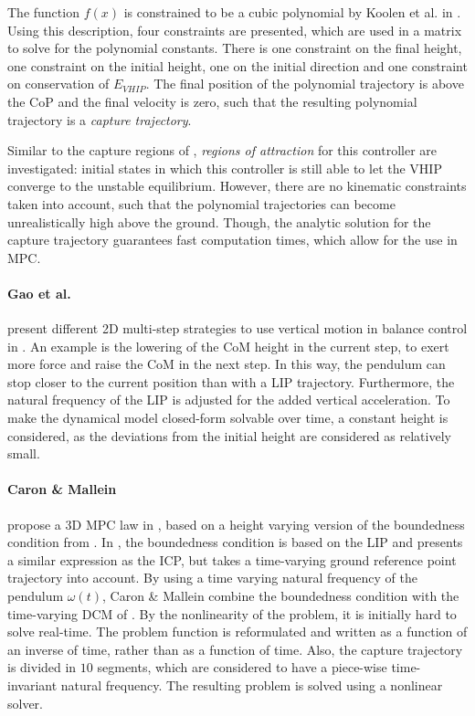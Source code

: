 The function $f(x)$ is constrained to be a cubic polynomial by Koolen et al. in \cite{koolen2016balance}. Using this description, four constraints are presented, which are used in a matrix to solve for the polynomial constants. There is one constraint on the final height, one constraint on the initial height, one on the initial direction and one constraint on conservation of $E_{VHIP}$. The final position of the polynomial trajectory is above the \ac{CoP} and the final velocity is zero, such that the resulting polynomial trajectory is a \textit{capture trajectory}. 

Similar to the capture regions of \cite{pratt2006capture}, \textit{regions of attraction} for this controller are investigated: initial states in which this controller is still able to let the \ac{VHIP} converge to the unstable equilibrium. However, there are no kinematic constraints taken into account, such that the polynomial trajectories can become unrealistically high above the ground. Though, the analytic solution for the capture trajectory guarantees fast computation times, which allow for the use in \ac{MPC}.

\paragraph{Gao et al.} present different \ac{2D} multi-step strategies to use vertical motion in balance control in \cite{gao2017increase}. An example is the lowering of the \ac{CoM} height in the current step, to exert more force and raise the \ac{CoM} in the next step. In this way, the pendulum can stop closer to the current position than with a \ac{LIP} trajectory. Furthermore, the natural frequency of the \ac{LIP} is adjusted for the added vertical acceleration. To make the dynamical model closed-form solvable over time, a constant height is considered, as the deviations from the initial height are considered as relatively small.

\paragraph{Caron \& Mallein} propose a \ac{3D} \ac{MPC} law in \cite{caron2018balance}, based on a height varying version of the boundedness condition from \cite{lanari2014boundedness}. In \cite{lanari2014boundedness}, the boundedness condition is based on the \ac{LIP} and presents a similar expression as the \ac{ICP}, but takes a time-varying ground reference point trajectory into account.  By using a time varying natural frequency of the pendulum $\omega(t)$, Caron \& Mallein combine the boundedness condition with the time-varying \ac{DCM} of \cite{hopkins2014humanoid}. By the nonlinearity of the problem, it is initially hard to solve real-time. The problem function is reformulated and written as a function of an inverse of time, rather than as a function of time. Also, the capture trajectory is divided in $10$ segments, which are considered to have a piece-wise time-invariant natural frequency. The resulting problem is solved using a nonlinear solver.


